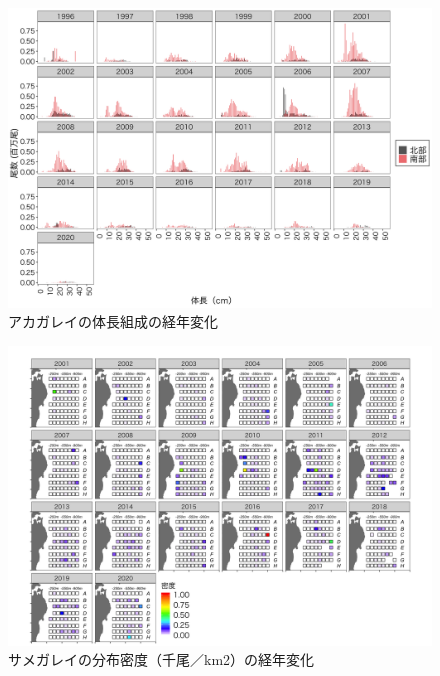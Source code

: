 \documentclass[11pt]{article} %
\begin{document}
\begin{linenumbers}
\begin{figure}[h]
  \centering
  \includegraphics[width = 14cm]{アカガレイlength.png}
  \caption{アカガレイの体長組成の経年変化}
\end{figure}

\begin{figure}[h]
  \centering
  \includegraphics[width = 14cm]{サメガレイdens.png}
  \caption{サメガレイの分布密度（千尾／km2）の経年変化}
\end{figure}


\end{linenumbers}
\end{document}
